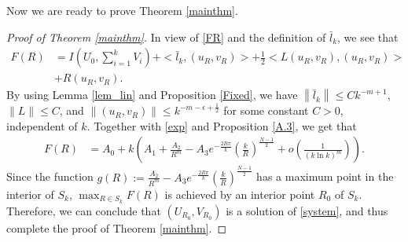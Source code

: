 \documentclass{amsart}
\def\red{\color{red}}
\theoremstyle{definition}
\theoremstyle{remark}
\numberwithin{equation}{section}
\begin{document}
Now we are ready to prove Theorem \ref{mainthm}.  
\begin{proof}[Proof of Theorem \ref{mainthm}]
In view of \eqref{FR} and the definition of $\bar{l}_k$, we see that 
\begin{equation}\begin{aligned}\label{FR2}
F(R)&=I\left(U_{0}, \sum_{i=1}^{k} V_{i}\right)+<\bar{l}_k,(u_{R}, v_{R})>+\frac{1}{2}<L\left(u_{R}, v_{R}\right),\left(u_{R}, v_{R}\right)>\\&+R\left(u_{R}, v_{R}\right).\end{aligned}
\end{equation}
By using Lemma \ref{lem_lin} and Proposition \ref{Fixed}, we have   $\left\|\bar{l}_{k}\right\| \leq C k^{-m+1}$, $\|L\|\le C$, and $\|(u_R,v_R)\| \le k^{-m -\epsilon+ \frac{1}{2}}$ for some constant $C>0$, independent of $k$. 
Together with \eqref{exp} and Proposition \ref{A.3}, we get that 
\begin{equation}\begin{aligned}\label{FR}
F(R)&= A_0+ 
 k\left(A_1+\frac{A_2}{R^{m}}-A_3e^{-\frac{2R\pi}{k}}\left(\frac{k}{R}\right)^{\frac{N-1}{2}}+o\left(\frac{1}{(k\ln k)^m}\right)\right).
\end{aligned}
\end{equation}
Since  the function $g(R):=\frac{A_2}{R^{m}}-A_3e^{-\frac{2R\pi}{k}}\left(\frac{k}{R}\right)^{\frac{N-1}{2}}$ has a maximum point in the interior of $S_k$,    $\max _{R \in S_{k}} F(R)$ is achieved by an interior point $R_0$ of $S_{k}$. Therefore,  we can conclude that  $(U_{R_0}, V_{R_0})$ is a solution of \eqref{system}, and thus complete the proof of Theorem \ref{mainthm}.
\end{proof}

%
\end{document}
